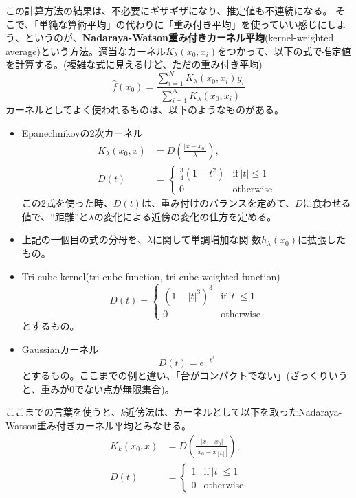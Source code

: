 \documentclass{jsarticle}
\begin{document}
この計算方法の結果は、不必要にギザギザになり、推定値も不連続になる。
そこで、「単純な算術平均」の代わりに「重み付き平均」を使っていい感じにしよう、というのが、\textbf{Nadaraya-Watson重み付きカーネル平均}(kernel-weighted average)という方法。適当なカーネル$K_{\lambda}(x_{0}, x_{i})$をつかって、以下の式で推定値を計算する。(複雑な式に見えるけど、ただの重み付き平均)
\[
  \hat{f} (x_{0})=\frac{\sum_{i=1}^{N}K_{\lambda}(x_{0}, x_{i})y_{i}}{\sum_{i=1}^{N}K_{\lambda}(x_{0}, x_{i})}
\]
カーネルとしてよく使われるものは、以下のようなものがある。
\begin{itemize}
  \item Epanechnikovの2次カーネル
    \begin{align*}
      K_{\lambda}(x_{0}, x) &=D \left (\frac{|x-x_{0}|}{\lambda} \right ),  \\
      D(t) &=
      \begin{cases}
          \frac{3}{4}(1-t^{2}) & \mathrm{if} \  |t| \le 1 \\
          0 & \mathrm{otherwise}
      \end{cases}
    \end{align*}
    この2式を使った時、$D(t)$は、重み付けのバランスを定めて、$D$に食わせる値で、``距離''と$\lambda$の変化による近傍の変化の仕方を定める。
  \item 上記の一個目の式の分母を、$\lambda$に関して単調増加な関 数$h_{\lambda}(x_{0})$に拡張したもの。
  \item Tri-cube kernel(tri-cube function, tri-cube weighted function)
    \[
      D(t) =
      \begin{cases}
          (1-|t|^{3})^{3} & \mathrm{if} \  |t| \le 1 \\
          0 & \mathrm{otherwise}
      \end{cases}
    \]
    とするもの。
  \item Gaussianカーネル
    \[
      D(t) = e^{-t^{2}}
    \]
    とするもの。ここまでの例と違い、「台がコンパクトでない」(ざっくりいうと、重みが0でない点が無限集合)。
\end{itemize}

ここまでの言葉を使うと、$k$近傍法は、カーネルとして以下を取ったNadaraya-Watson重み付きカーネル平均とみなせる。
\begin{align*}
  K_{k}(x_{0}, x) &=D \left (\frac{|x-x_{0}|}{|x_{0}-x_{[k]}|} \right ),  \\
  D(t) &=
  \begin{cases}
    1 & \mathrm{if} \  |t| \le 1 \\
    0 & \mathrm{otherwise}
  \end{cases}
\end{align*}
\end{document}
